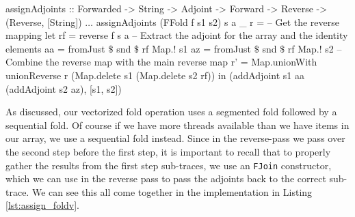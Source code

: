             \begin{haskell}[caption=Reverse pass over a sequential fold, label=lst:assign_fold, gobble=16]
                assignAdjoints :: Forwarded -> String -> Adjoint -> Forward -> Reverse
                    -> (Reverse, [String])
                $\dots$
                assignAdjoints (FFold f s1 s2) s a _ r =
                        -- Get the reverse mapping
                    let rf = reverse f s a
                        -- Extract the adjoint for the array and the identity elements
                        aa = fromJust $\$$ snd $\$$ rf Map.! s1
                        az = fromJust $\$$ snd $\$$ rf Map.! s2
                        -- Combine the reverse map with the main reverse map
                        r' = Map.unionWith unionReverse r (Map.delete s1 (Map.delete s2 rf))
                    in  (addAdjoint s1 aa (addAdjoint s2 az), [s1, s2])
            \end{haskell}

            As discussed, our vectorized fold operation uses a segmented fold followed by a sequential fold.
            Of course if we have more threads available than we have items in our array, we use a sequential fold instead.
            Since in the reverse-pass we pass over the second step before the first step, it is important to recall that to properly gather the results from the first step sub-traces, we use an \texttt{FJoin} constructor, which we can use in the reverse pass to pass the adjoints back to the correct sub-trace.
            We can see this all come together in the implementation in Listing \ref{lst:assign_foldv}.
            
